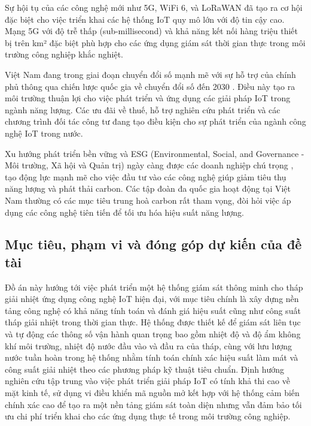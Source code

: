 \documentclass[../main.tex]{subfiles}
\begin{document}
Sự hội tụ của các công nghệ mới như 5G, WiFi 6, và LoRaWAN đã tạo ra cơ hội đặc biệt cho việc triển khai các hệ thống IoT quy mô lớn với độ tin cậy cao. Mạng 5G với độ trễ thấp (sub-millisecond) và khả năng kết nối hàng triệu thiết bị trên km² đặc biệt phù hợp cho các ứng dụng giám sát thời gian thực trong môi trường công nghiệp khắc nghiệt.

Việt Nam đang trong giai đoạn chuyển đổi số mạnh mẽ với sự hỗ trợ của chính phủ thông qua chiến lược quốc gia về chuyển đổi số đến 2030 \cite{vietnam2023digital}. Điều này tạo ra môi trường thuận lợi cho việc phát triển và ứng dụng các giải pháp IoT trong ngành năng lượng. Các ưu đãi về thuế, hỗ trợ nghiên cứu phát triển và các chương trình đối tác công tư đang tạo điều kiện cho sự phát triển của ngành công nghệ IoT trong nước.

Xu hướng phát triển bền vững và ESG (Environmental, Social, and Governance - Môi trường, Xã hội và Quản trị) ngày càng được các doanh nghiệp chú trọng \cite{deloitte2023esg}, tạo động lực mạnh mẽ cho việc đầu tư vào các công nghệ giúp giảm tiêu thụ năng lượng và phát thải carbon. Các tập đoàn đa quốc gia hoạt động tại Việt Nam thường có các mục tiêu trung hoà carbon rất tham vọng, đòi hỏi việc áp dụng các công nghệ tiên tiến để tối ưu hóa hiệu suất năng lượng.

\subsection{Mục tiêu, phạm vi và đóng góp dự kiến của đề tài}
\label{sec:thesis_objectives_scope_contributions}

Đồ án này hướng tới việc phát triển một hệ thống giám sát thông minh cho tháp giải nhiệt ứng dụng công nghệ IoT hiện đại, với mục tiêu chính là xây dựng nền tảng công nghệ có khả năng tính toán và đánh giá hiệu suất cũng như công suất tháp giải nhiệt trong thời gian thực. Hệ thống được thiết kế để giám sát liên tục và tự động các thông số vận hành quan trọng bao gồm nhiệt độ và độ ẩm không khí môi trường, nhiệt độ nước đầu vào và đầu ra của tháp, cùng với lưu lượng nước tuần hoàn trong hệ thống nhằm tính toán chính xác hiệu suất làm mát và công suất giải nhiệt theo các phương pháp kỹ thuật tiêu chuẩn. Định hướng nghiên cứu tập trung vào việc phát triển giải pháp IoT có tính khả thi cao về mặt kinh tế, sử dụng vi điều khiển mã nguồn mở kết hợp với hệ thống cảm biến chính xác cao để tạo ra một nền tảng giám sát toàn diện nhưng vẫn đảm bảo tối ưu chi phí triển khai cho các ứng dụng thực tế trong môi trường công nghiệp.
\end{document}
